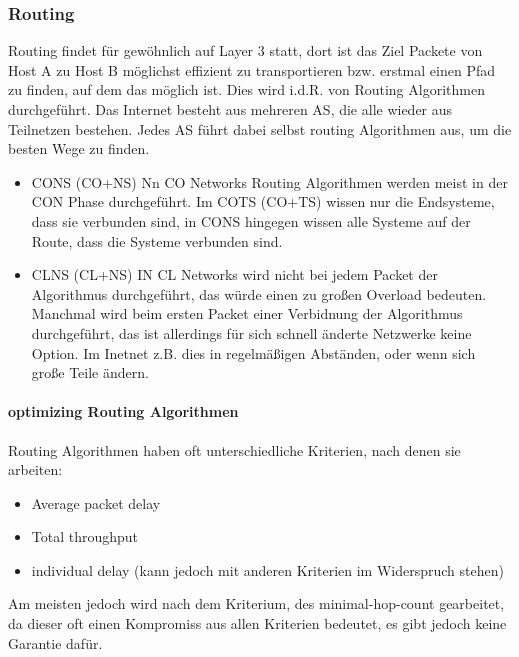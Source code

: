 		\subsubsection{Routing}
			Routing findet für gewöhnlich auf Layer 3 statt, dort ist das Ziel Packete von Host A zu Host B möglichst effizient zu transportieren bzw. erstmal einen Pfad zu finden, auf dem das möglich ist. Dies wird i.d.R. von Routing Algorithmen durchgeführt. Das Internet besteht aus mehreren AS, die alle wieder aus Teilnetzen bestehen. Jedes AS führt dabei selbst routing Algorithmen aus, um die besten Wege zu finden. 
			\begin{itemize}
				\item CONS (CO+NS)
					Nn CO Networks Routing Algorithmen werden meist in der CON Phase durchgeführt. Im COTS (CO+TS) wissen nur die Endsysteme, dass sie verbunden sind, in CONS hingegen wissen alle Systeme auf der Route, dass die Systeme verbunden sind.
				\item CLNS (CL+NS)
					IN CL Networks wird nicht bei jedem Packet der Algorithmus durchgeführt, das würde einen zu großen Overload bedeuten. Manchmal wird beim ersten Packet einer Verbidnung der Algorithmus durchgeführt, das ist allerdings für sich schnell änderte Netzwerke keine Option. Im Inetnet z.B. dies in regelmäßigen Abständen, oder wenn sich große Teile ändern.
			\end{itemize}
			
		\paragraph{optimizing Routing Algorithmen}
			Routing Algorithmen haben oft unterschiedliche Kriterien, nach denen sie arbeiten:
			\begin{itemize}
				\item Average packet delay
				\item Total throughput
				\item individual delay (kann jedoch mit anderen Kriterien im Widerspruch stehen)
			\end{itemize}
			Am meisten jedoch wird nach dem Kriterium, des minimal-hop-count gearbeitet, da dieser oft einen Kompromiss aus allen Kriterien bedeutet, es gibt jedoch keine Garantie dafür. 
	
